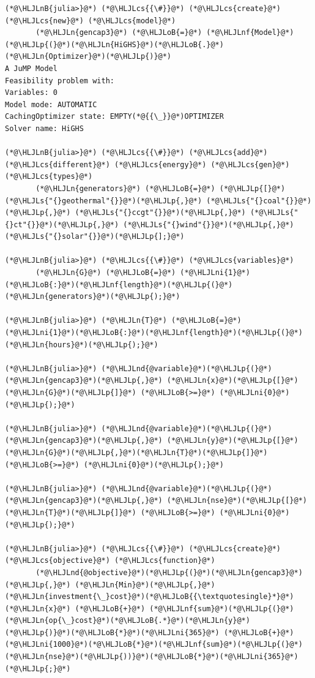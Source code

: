 \documentclass[12pt,a4paper]{article}
\newcommand{\HLJLn}[1]{#1}
\newcommand{\HLJLnd}[1]{\textcolor[RGB]{214,102,97}{#1}}
\newcommand{\HLJLnf}[1]{\textcolor[RGB]{66,102,213}{#1}}
\newcommand{\HLJLs}[1]{\textcolor[RGB]{201,61,57}{#1}}
\newcommand{\HLJLnB}[1]{\textcolor[RGB]{59,151,46}{#1}}
\newcommand{\HLJLni}[1]{\textcolor[RGB]{59,151,46}{#1}}
\newcommand{\HLJLoB}[1]{\textcolor[RGB]{102,102,102}{\textbf{#1}}}
\newcommand{\HLJLp}[1]{#1}
\newcommand{\HLJLcs}[1]{\textcolor[RGB]{153,153,119}{\textit{#1}}}
\begin{document}
\begin{lstlisting}
(*@\HLJLnB{julia>}@*) (*@\HLJLcs{{\#}}@*) (*@\HLJLcs{create}@*) (*@\HLJLcs{new}@*) (*@\HLJLcs{model}@*)
       (*@\HLJLn{gencap3}@*) (*@\HLJLoB{=}@*) (*@\HLJLnf{Model}@*)(*@\HLJLp{(}@*)(*@\HLJLn{HiGHS}@*)(*@\HLJLoB{.}@*)(*@\HLJLn{Optimizer}@*)(*@\HLJLp{)}@*)
A JuMP Model
Feasibility problem with:
Variables: 0
Model mode: AUTOMATIC
CachingOptimizer state: EMPTY(*@{{\_}}@*)OPTIMIZER
Solver name: HiGHS

(*@\HLJLnB{julia>}@*) (*@\HLJLcs{{\#}}@*) (*@\HLJLcs{add}@*) (*@\HLJLcs{different}@*) (*@\HLJLcs{energy}@*) (*@\HLJLcs{gen}@*) (*@\HLJLcs{types}@*)
       (*@\HLJLn{generators}@*) (*@\HLJLoB{=}@*) (*@\HLJLp{[}@*)(*@\HLJLs{"{}geothermal"{}}@*)(*@\HLJLp{,}@*) (*@\HLJLs{"{}coal"{}}@*)(*@\HLJLp{,}@*) (*@\HLJLs{"{}ccgt"{}}@*)(*@\HLJLp{,}@*) (*@\HLJLs{"{}ct"{}}@*)(*@\HLJLp{,}@*) (*@\HLJLs{"{}wind"{}}@*)(*@\HLJLp{,}@*) (*@\HLJLs{"{}solar"{}}@*)(*@\HLJLp{];}@*)

(*@\HLJLnB{julia>}@*) (*@\HLJLcs{{\#}}@*) (*@\HLJLcs{variables}@*)
       (*@\HLJLn{G}@*) (*@\HLJLoB{=}@*) (*@\HLJLni{1}@*)(*@\HLJLoB{:}@*)(*@\HLJLnf{length}@*)(*@\HLJLp{(}@*)(*@\HLJLn{generators}@*)(*@\HLJLp{);}@*)

(*@\HLJLnB{julia>}@*) (*@\HLJLn{T}@*) (*@\HLJLoB{=}@*) (*@\HLJLni{1}@*)(*@\HLJLoB{:}@*)(*@\HLJLnf{length}@*)(*@\HLJLp{(}@*)(*@\HLJLn{hours}@*)(*@\HLJLp{);}@*)

(*@\HLJLnB{julia>}@*) (*@\HLJLnd{@variable}@*)(*@\HLJLp{(}@*)(*@\HLJLn{gencap3}@*)(*@\HLJLp{,}@*) (*@\HLJLn{x}@*)(*@\HLJLp{[}@*)(*@\HLJLn{G}@*)(*@\HLJLp{]}@*) (*@\HLJLoB{>=}@*) (*@\HLJLni{0}@*)(*@\HLJLp{);}@*)

(*@\HLJLnB{julia>}@*) (*@\HLJLnd{@variable}@*)(*@\HLJLp{(}@*)(*@\HLJLn{gencap3}@*)(*@\HLJLp{,}@*) (*@\HLJLn{y}@*)(*@\HLJLp{[}@*)(*@\HLJLn{G}@*)(*@\HLJLp{,}@*)(*@\HLJLn{T}@*)(*@\HLJLp{]}@*) (*@\HLJLoB{>=}@*) (*@\HLJLni{0}@*)(*@\HLJLp{);}@*)

(*@\HLJLnB{julia>}@*) (*@\HLJLnd{@variable}@*)(*@\HLJLp{(}@*)(*@\HLJLn{gencap3}@*)(*@\HLJLp{,}@*) (*@\HLJLn{nse}@*)(*@\HLJLp{[}@*)(*@\HLJLn{T}@*)(*@\HLJLp{]}@*) (*@\HLJLoB{>=}@*) (*@\HLJLni{0}@*)(*@\HLJLp{);}@*)

(*@\HLJLnB{julia>}@*) (*@\HLJLcs{{\#}}@*) (*@\HLJLcs{create}@*) (*@\HLJLcs{objective}@*) (*@\HLJLcs{function}@*)
       (*@\HLJLnd{@objective}@*)(*@\HLJLp{(}@*)(*@\HLJLn{gencap3}@*)(*@\HLJLp{,}@*) (*@\HLJLn{Min}@*)(*@\HLJLp{,}@*) (*@\HLJLn{investment{\_}cost}@*)(*@\HLJLoB{{\textquotesingle}*}@*)(*@\HLJLn{x}@*) (*@\HLJLoB{+}@*) (*@\HLJLnf{sum}@*)(*@\HLJLp{(}@*)(*@\HLJLn{op{\_}cost}@*)(*@\HLJLoB{.*}@*)(*@\HLJLn{y}@*)(*@\HLJLp{)}@*)(*@\HLJLoB{*}@*)(*@\HLJLni{365}@*) (*@\HLJLoB{+}@*) (*@\HLJLni{1000}@*)(*@\HLJLoB{*}@*)(*@\HLJLnf{sum}@*)(*@\HLJLp{(}@*)(*@\HLJLn{nse}@*)(*@\HLJLp{))}@*)(*@\HLJLoB{*}@*)(*@\HLJLni{365}@*)(*@\HLJLp{;}@*)


\end{lstlisting}
\end{document}
